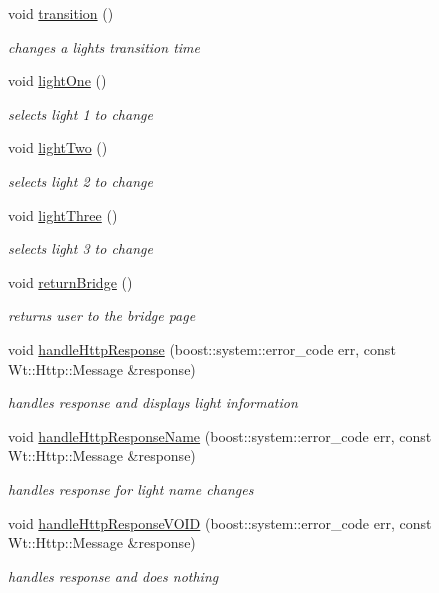 \begin{DoxyCompactItemize}
void \hyperlink{class_lights_control_widget_a10fad17f0722f34402a906c77c1711bb}{transition} ()
\begin{DoxyCompactList}\small\item\em changes a light\textquotesingle{}s transition time \end{DoxyCompactList}\item 
void \hyperlink{class_lights_control_widget_aedb19ca01377b31ba326bd0e0f82138d}{light\+One} ()
\begin{DoxyCompactList}\small\item\em selects light 1 to change \end{DoxyCompactList}\item 
void \hyperlink{class_lights_control_widget_a8606dd33428f5c5cd7a1e686053b296d}{light\+Two} ()
\begin{DoxyCompactList}\small\item\em selects light 2 to change \end{DoxyCompactList}\item 
void \hyperlink{class_lights_control_widget_a670eae4637f1cc78febb3a751e4272dc}{light\+Three} ()
\begin{DoxyCompactList}\small\item\em selects light 3 to change \end{DoxyCompactList}\item 
void \hyperlink{class_lights_control_widget_a4b17ac832e826eb5665a8f69fe73c5f4}{return\+Bridge} ()
\begin{DoxyCompactList}\small\item\em returns user to the bridge page \end{DoxyCompactList}\item 
void \hyperlink{class_lights_control_widget_a0fd696e3500ca64cfeddd08738e5b6cf}{handle\+Http\+Response} (boost\+::system\+::error\+\_\+code err, const Wt\+::\+Http\+::\+Message \&response)
\begin{DoxyCompactList}\small\item\em handles response and displays light information \end{DoxyCompactList}\item 
void \hyperlink{class_lights_control_widget_ace0f0ce6387f25f695ac83a46a765a74}{handle\+Http\+Response\+Name} (boost\+::system\+::error\+\_\+code err, const Wt\+::\+Http\+::\+Message \&response)
\begin{DoxyCompactList}\small\item\em handles response for light name changes \end{DoxyCompactList}\item 
void \hyperlink{class_lights_control_widget_a9cc86543ee2df1d0bb09c35b0e2fac90}{handle\+Http\+Response\+V\+O\+ID} (boost\+::system\+::error\+\_\+code err, const Wt\+::\+Http\+::\+Message \&response)
\begin{DoxyCompactList}\small\item\em handles response and does nothing \end{DoxyCompactList}\end{DoxyCompactItemize}

